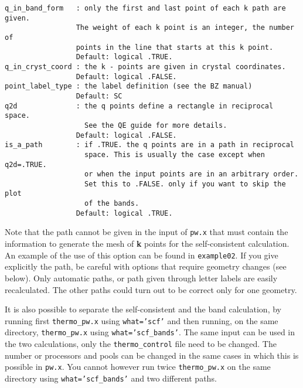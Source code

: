 \documentclass[12pt,a4paper]{article}
\begin{document}
\begin{verbatim}
q_in_band_form   : only the first and last point of each k path are given.
                 The weight of each k point is an integer, the number of 
                 points in the line that starts at this k point.
                 Default: logical .TRUE.
q_in_cryst_coord : the k - points are given in crystal coordinates.
                 Default: logical .FALSE.
point_label_type : the label definition (see the BZ manual)
                 Default: SC
q2d              : the q points define a rectangle in reciprocal space.
                   See the QE guide for more details.
                 Default: logical .FALSE.
is_a_path        : if .TRUE. the q points are in a path in reciprocal 
                   space. This is usually the case except when q2d=.TRUE. 
                   or when the input points are in an arbitrary order.
                   Set this to .FALSE. only if you want to skip the plot
                   of the bands.
                 Default: logical .TRUE.
\end{verbatim}
Note that the path cannot be given in the input of \texttt{pw.x} that
must contain the information to generate the mesh of {\bf k} points 
for the self-consistent calculation. 
An example of the use of this option can be found in \texttt{example02}.
If you give explicitly the path, be careful with options that require
geometry changes (see below). Only automatic paths, or path given through 
letter labels are easily recalculated. The other paths could turn out 
to be correct only for one geometry.

It is also possible to separate the self-consistent and the band calculation,
by running first \texttt{thermo\_pw.x} using \texttt{what='scf'} and then
running, on the same directory, \texttt{thermo\_pw.x} using 
\texttt{what='scf\_bands'}. The same input can be used in the two 
calculations, only the \texttt{thermo\_control} file need to be changed. 
The number or processors and pools can be changed in the same cases in
which this is possible in \texttt{pw.x}.
You cannot however run twice \texttt{thermo\_pw.x} on the same 
directory using \texttt{what='scf\_bands'} and two different paths.
\end{document}
